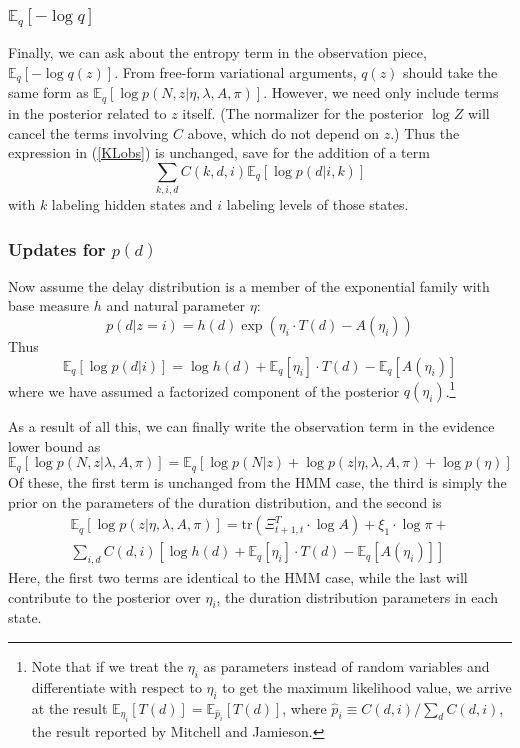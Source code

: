 \documentclass[11pt]{article}
\begin{document}
\subsubsection{$\mathbb{E}_q[-\log q]$}
Finally, we can ask about the entropy term in the observation piece, $\mathbb{E}_q[-\log q(z)]$. From free-form variational arguments, $q(z)$ should take the same form as $\mathbb{E}_q[\log p(N, z|\eta, \lambda, A, \pi)]$. However, we need only include terms in the posterior related to $z$ itself. (The normalizer for the posterior $\log Z$ will cancel the terms involving $C$ above, which do not depend on $z$.) Thus the expression in (\ref{KLobs}) is unchanged, save for the addition of a term
\begin{equation}
    \sum_{k, i, d} C(k, d, i) \mathbb{E}_q\left[ \log p(d|i, k) \right]
\end{equation}
with $k$ labeling hidden states and $i$ labeling levels of those states.

\subsubsection{Updates for $p(d)$}
Now assume the delay distribution is a member of the exponential family with base measure $h$ and natural parameter $\eta$:
\begin{equation}
    p(d|z=i) = h(d) \exp(\eta_i \cdot T(d) - A(\eta_i))
\end{equation}
Thus
\begin{equation}
    \mathbb{E}_q[\log p(d|i)] = \log h(d) + \mathbb{E}_q[\eta_i] \cdot T(d) -
    \mathbb{E}_q[A(\eta_i)]
\end{equation}
where we have assumed a factorized component of the posterior $q(\eta_i)$.\footnote{Note that if we treat the $\eta_i$ as parameters instead of random variables and differentiate with respect to $\eta_i$ to get the maximum likelihood value, we arrive at the result $\mathbb{E}_{\eta_i}[T(d)] = \mathbb{E}_{\hat{p}_i}[T(d)]$, where $\hat{p}_i \equiv C(d, i) / \sum_d C(d, i)$, the result reported by Mitchell and Jamieson.}

As a result of all this, we can finally write the observation term in the evidence lower bound as
\begin{equation}
    \mathbb{E}_q[\log p(N, z|\lambda, A, \pi)] = 
    \mathbb{E}_q[\log p(N|z) + \log p(z|\eta, \lambda, A, \pi) + \log p(\eta)]
\end{equation}
Of these, the first term is unchanged from the HMM case, the third is simply the prior on the parameters of the duration distribution, and the second is
\begin{multline}
    \mathbb{E}_q [\log p(z|\eta, \lambda, A, \pi)] = 
    \mathrm{tr}(\Xi^T_{t+1, t} \cdot \log A) + \xi_1 \cdot \log \pi + \\ 
    \sum_{i, d} C(d, i) [ \log h(d) + \mathbb{E}_q[\eta_i] \cdot T(d) -
    \mathbb{E}_q[A(\eta_i)] ]
\end{multline}
Here, the first two terms are identical to the HMM case, while the last will contribute to the posterior over $\eta_i$, the duration distribution parameters in each state.
\end{document}
